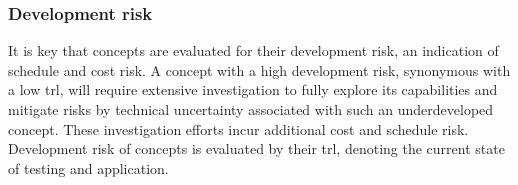 \subsubsection{Development risk}
It is key that concepts are evaluated for their development risk, an indication of schedule and cost risk. A concept with a high development risk, synonymous with a low \gls{trl}, will require extensive investigation to fully explore its capabilities and mitigate risks by technical uncertainty associated with such an underdeveloped concept. These investigation efforts incur additional cost and schedule risk. Development risk of concepts is evaluated by their \gls{trl}, denoting the current state of testing and application.



